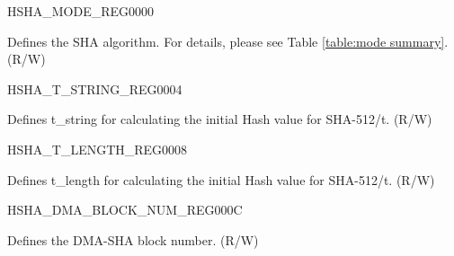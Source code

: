\begin{register}{H}{SHA\_MODE\_REG}{\hexprefix{}0000}\label{regdesc:SHAMODEREG}
%
%
\regnewline%
\begin{regdesc}\begin{reglist}
\label{fielddesc:SHAMODE}\item [SHA\_MODE] Defines the SHA algorithm. For details, please see Table \ref{table:mode summary}. (R/W)
\end{reglist}\end{regdesc}
\end{register}


\begin{register}{H}{SHA\_T\_STRING\_REG}{\hexprefix{}0004}\label{regdesc:SHATSTRINGREG}
%
\regnewline%
\begin{regdesc}\begin{reglist}
\label{fielddesc:SHATSTRING}\item [SHA\_T\_STRING] Defines t\_string for calculating the initial Hash value for SHA-512/t. (R/W)
\end{reglist}\end{regdesc}
\end{register}


\begin{register}{H}{SHA\_T\_LENGTH\_REG}{\hexprefix{}0008}\label{regdesc:SHATLENGTHREG}
%
%
\regnewline%
\begin{regdesc}\begin{reglist}
\label{fielddesc:SHATLENGTH}\item [SHA\_T\_LENGTH] Defines t\_length for calculating the initial Hash value for SHA-512/t. (R/W)
\end{reglist}\end{regdesc}
\end{register}


\begin{register}{H}{SHA\_DMA\_BLOCK\_NUM\_REG}{\hexprefix{}000C}\label{regdesc:SHADMABLOCKNUMREG}
%
%
\regnewline%
\begin{regdesc}\begin{reglist}
\label{fielddesc:SHADMABLOCKNUM}\item [SHA\_DMA\_BLOCK\_NUM] Defines the DMA-SHA block number. (R/W)
\end{reglist}\end{regdesc}
\end{register}

